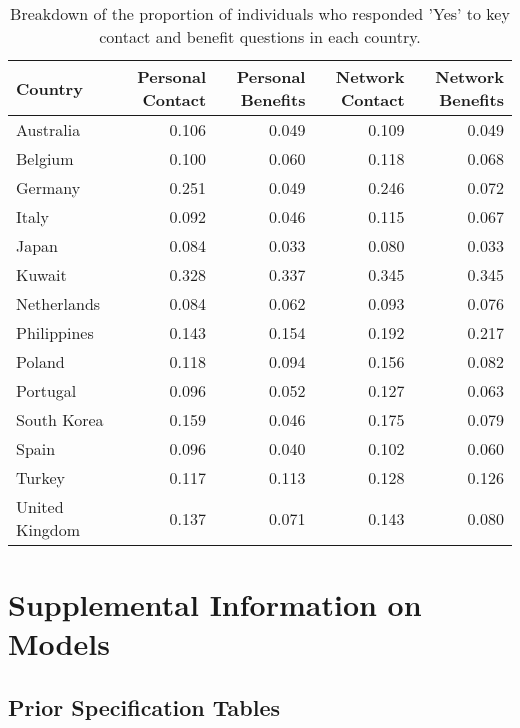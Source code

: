 \documentclass[
]{book}
\theoremstyle{definition}
\theoremstyle{definition}
\theoremstyle{definition}
\theoremstyle{definition}
\theoremstyle{remark}
\begin{document}
\begin{table}

\caption{\label{tab:contact-benefits-summary}Breakdown of the proportion of individuals who responded 'Yes' to key contact and benefit questions in each country.}
\centering
\fontsize{11}{13}\selectfont
\begin{tabular}[t]{l|r|r|r|r}
\hline
Country & Personal Contact & Personal Benefits & Network Contact & Network Benefits\\
\hline
Australia & 0.106 & 0.049 & 0.109 & 0.049\\
\hline
Belgium & 0.100 & 0.060 & 0.118 & 0.068\\
\hline
Germany & 0.251 & 0.049 & 0.246 & 0.072\\
\hline
Italy & 0.092 & 0.046 & 0.115 & 0.067\\
\hline
Japan & 0.084 & 0.033 & 0.080 & 0.033\\
\hline
Kuwait & 0.328 & 0.337 & 0.345 & 0.345\\
\hline
Netherlands & 0.084 & 0.062 & 0.093 & 0.076\\
\hline
Philippines & 0.143 & 0.154 & 0.192 & 0.217\\
\hline
Poland & 0.118 & 0.094 & 0.156 & 0.082\\
\hline
Portugal & 0.096 & 0.052 & 0.127 & 0.063\\
\hline
South Korea & 0.159 & 0.046 & 0.175 & 0.079\\
\hline
Spain & 0.096 & 0.040 & 0.102 & 0.060\\
\hline
Turkey & 0.117 & 0.113 & 0.128 & 0.126\\
\hline
United Kingdom & 0.137 & 0.071 & 0.143 & 0.080\\
\hline
\end{tabular}
\end{table}

\hypertarget{supplemental-information-on-models}{%
\section{Supplemental Information on Models}\label{supplemental-information-on-models}}

\hypertarget{prior-specification-tables}{%
\subsection{Prior Specification Tables}\label{prior-specification-tables}}
\end{document}
